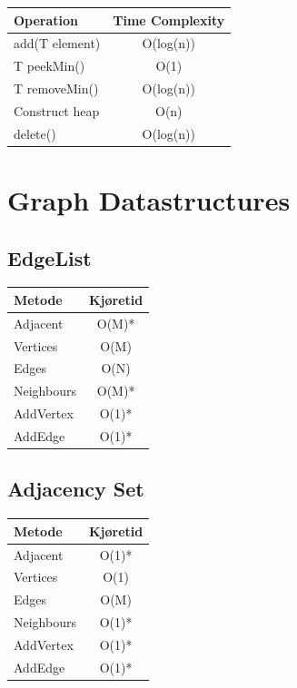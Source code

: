 \documentclass{article}
\begin{document}
\begin{table}[!ht]
\centering
\begin{tabular}{|l|c|}
\hline
\textbf{Operation} & \textbf{Time Complexity} \\
\hline
add(T element) & O(log(n)) \\
\hline
T peekMin() & O(1) \\
\hline
T removeMin() & O(log(n)) \\
\hline
Construct heap & O(n) \\
\hline
delete() & O(log(n)) \\
\hline
\end{tabular}
\end{table}


\section{Graph Datastructures}
\subsection{EdgeList}
\begin{table}[!ht]
\centering
\begin{tabular}{|l|c|}
\hline
\textbf{Metode} & \textbf{Kjøretid} \\
\hline
Adjacent & O(M)* \\
\hline
Vertices & O(M) \\
\hline
Edges & O(N) \\
\hline
Neighbours & O(M)* \\
\hline
AddVertex & O(1)* \\
\hline
AddEdge & O(1)* \\
\hline
\end{tabular}
\end{table}



\subsection{Adjacency Set}
\begin{table}[!ht]
\centering
\begin{tabular}{|l|c|}
\hline
\textbf{Metode} & \textbf{Kjøretid} \\
\hline
Adjacent & O(1)* \\
\hline
Vertices & O(1) \\
\hline
Edges & O(M) \\
\hline
Neighbours & O(1)* \\
\hline
AddVertex & O(1)* \\
\hline
AddEdge & O(1)* \\
\hline
\end{tabular}
\end{table}
\end{document}
